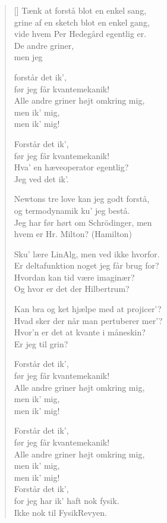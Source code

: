 {\begin{multicols}
\begin{verse}[\versewidth]
Tænk at forstå blot en enkel sang,\\
grine af en sketch blot en enkel gang,\\
vide hvem Per Hedegård egentlig er.\\
De andre griner,\\
men jeg

forstår det ik',\\
før jeg får kvantemekanik!\\
Alle andre griner højt omkring mig,\\
men ik' mig,\\
men ik' mig!

Forstår det ik',\\
før jeg får kvantemekanik!\\
Hva' en hæveoperator egentlig?\\
Jeg ved det ik'.
\columnbreak

Newtons tre love kan jeg godt forstå,\\
og termodynamik ku' jeg bestå.\\
Jeg har før hørt om Schrödinger, men\\
hvem er Hr. Milton? (Hamilton)

Sku' lære LinAlg, men ved ikke hvorfor.\\
Er deltafunktion noget jeg får brug for?\\
Hvordan kan tid være imaginær?\\
Og hvor er det der Hilbertrum?

Kan bra og ket hjælpe med at projicer'?\\
Hvad sker der når man pertuberer mer'?\\
Hvor'n er det at kvante i måneskin?\\
Er jeg til grin?

Forstår det ik',\\
før jeg får kvantemekanik!\\
Alle andre griner højt omkring mig,\\
men ik' mig,\\
men ik' mig!

Forstår det ik',\\
før jeg får kvantemekanik!\\
Alle andre griner højt omkring mig,\\
men ik' mig,\\
men ik' mig!\\
Forstår det ik',\\
for jeg har ik' haft nok fysik.\\
Ikke nok til FysikRevyen.
\end{verse}
\end{multicols}

}
